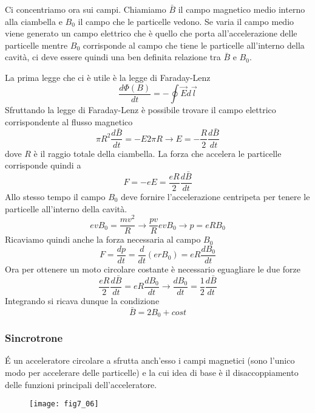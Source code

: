 Ci concentriamo ora sui campi.
Chiamiamo $\bar{B}$ il campo magnetico medio interno alla ciambella e $B_0$ il campo che le particelle vedono.
Se varia il campo medio viene generato un campo elettrico che è quello che porta all'accelerazione delle particelle mentre $B_0$ corrisponde al campo che tiene le particelle all'interno della cavità, ci deve essere quindi una ben definita relazione tra $\bar{B}$ e $B_0$.

La prima legge che ci è utile è la legge di Faraday-Lenz
\begin{equation}
\frac{d\Phi (B)}{dt}=-\oint \vec{E} d\vec{l}
\end{equation}
Sfruttando la legge di Faraday-Lenz è possibile trovare il campo elettrico corrispondente al flusso magnetico
\begin{equation}
\pi R^2\frac{d\bar{B}}{dt}=-E2\pi R \to E=-\frac{R}{2}\frac{d\bar{B}}{dt}
\end{equation}
dove $R$ è il raggio totale della ciambella.
La forza che accelera le particelle corrisponde quindi a 
\begin{equation}
F=-eE=\frac{eR}{2}\frac{d\bar{B}}{dt}
\end{equation}
Allo stesso tempo il campo $B_0$ deve fornire l'accelerazione centripeta per tenere le particelle all'interno della cavità.
\begin{equation}
evB_0=\frac{mv^2}{R}\to \frac{pv}{R}evB_0\to p=eRB_0
\end{equation}
Ricaviamo quindi anche la forza necessaria al campo $B_0$
\begin{equation}
F=\frac{dp}{dt}=\frac{d}{dt}(erB_0)=eR\frac{dB_0}{dt}
\end{equation}
Ora per ottenere un moto circolare costante è necessario eguagliare le due forze
\begin{equation}
\frac{eR}{2}\frac{d\bar{B}}{dt}=eR\frac{dB_0}{dt}\to \frac{dB_0}{dt}=\frac{1}{2}\frac{d\bar{B}}{dt}
\end{equation}
Integrando si ricava dunque la condizione 
\begin{equation}
\bar{B}=2B_0+cost
\end{equation}

\subsubsection{Sincrotrone}
\'E un acceleratore circolare a sfrutta anch'esso i campi magnetici (sono l'unico modo per accelerare delle particelle) e la cui idea di base è il disaccoppiamento delle funzioni principali dell'acceleratore.
\begin{figure}[h]
\centering
\texttt{[image: fig7\_06]}
\end{figure}

